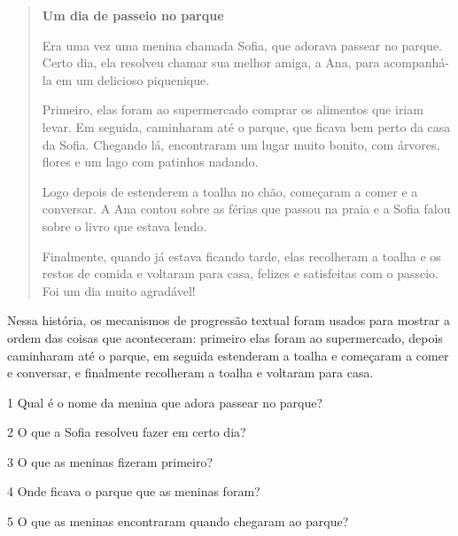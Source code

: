 \begin{quote}
\textbf{Um dia de passeio no parque}

Era uma vez uma menina chamada Sofia, que adorava passear no parque.
Certo dia, ela resolveu chamar sua melhor amiga, a Ana, para
acompanhá-la em um delicioso piquenique.

Primeiro, elas foram ao supermercado comprar os alimentos que iriam
levar. Em seguida, caminharam até o parque, que ficava bem perto da casa
da Sofia. Chegando lá, encontraram um lugar muito bonito, com árvores,
flores e um lago com patinhos nadando.

Logo depois de estenderem a toalha no chão, começaram a comer e a
conversar. A Ana contou sobre as férias que passou na praia e a Sofia
falou sobre o livro que estava lendo.

Finalmente, quando já estava ficando tarde, elas recolheram a toalha e
os restos de comida e voltaram para casa, felizes e satisfeitas com o
passeio. Foi um dia muito agradável!
\end{quote}

Nessa história, os mecanismos de progressão textual foram usados para
mostrar a ordem das coisas que aconteceram: primeiro elas foram ao
supermercado, depois caminharam até o parque, em seguida estenderam a
toalha e começaram a comer e conversar, e finalmente recolheram a toalha
e voltaram para casa.


\num{1} Qual é o nome da menina que adora passear no parque?



\num{2} O que a Sofia resolveu fazer em certo dia?



\num{3} O que as meninas fizeram primeiro?



\num{4} Onde ficava o parque que as meninas foram?



\num{5} O que as meninas encontraram quando chegaram ao parque?



